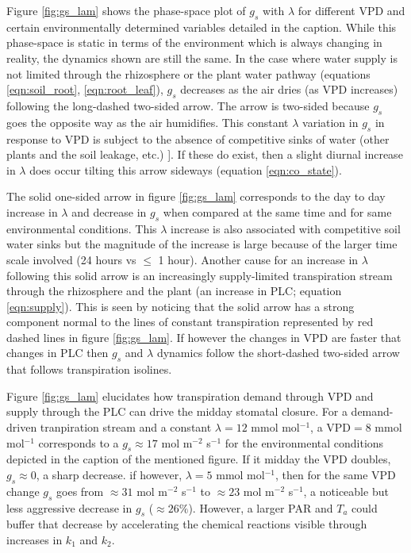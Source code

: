 \documentclass[utf8]{frontiersSCNS} %
\begin{document}
Figure \ref{fig:gs_lam} shows the phase-space plot of $g_s$ with $\lambda$ for different VPD and certain environmentally determined variables detailed in the caption. While this phase-space is static in terms of the environment which is always changing in reality, the dynamics shown are still the same. In the case where water supply is not limited through the rhizosphere or the plant water pathway (equations \ref{eqn:soil_root}, \ref{eqn:root_leaf}), $g_s$ decreases as the air dries (as VPD increases) following the long-dashed two-sided arrow. The arrow is two-sided because $g_s$ goes the opposite way as the air humidifies. This constant $\lambda$ variation in $g_s$ in response to VPD is subject to the absence of competitive sinks of water (other plants and the soil leakage, etc.) ]. If these do exist, then a slight diurnal increase in $\lambda$ does occur tilting this arrow sideways (equation \ref{eqn:co_state}).

The solid one-sided arrow in figure \ref{fig:gs_lam} corresponds to the day to day increase in $\lambda$ and decrease in $g_s$ when compared at the same time and for same environmental conditions. This $\lambda$ increase is also associated with competitive soil water sinks but the magnitude of the increase is large because of the larger time scale involved (24 hours vs $\leq$ 1 hour). Another cause for an increase in $\lambda$ following this solid arrow is an increasingly supply-limited transpiration stream through the rhizosphere and the plant (an increase in PLC; equation \ref{eqn:supply}). This is seen by noticing that the solid arrow has a strong component normal to the lines of constant transpiration represented by red dashed lines in figure \ref{fig:gs_lam}. If however the changes in VPD are faster that changes in PLC then $g_s$ and $\lambda$ dynamics follow the short-dashed two-sided arrow that follows transpiration isolines. 

Figure \ref{fig:gs_lam} elucidates how transpiration demand through VPD and supply through the PLC can drive the midday stomatal closure. For a demand-driven tranpiration stream and a constant $\lambda=12$ mmol mol$^{-1}$, a VPD$=8$ mmol mol$^{-1}$ corresponds to a $g_s\approx 17$ mol m$^{-2}$ s$^{-1}$ for the environmental conditions depicted in the caption of the mentioned figure. If it midday the VPD doubles, $g_s\approx 0$, a sharp decrease. if however, $\lambda=5$ mmol mol$^{-1}$, then for the same VPD change $g_s$ goes from $\approx 31$ mol m$^{-2}$ s$^{-1}$ to $\approx 23$ mol m$^{-2}$ s$^{-1}$, a noticeable but less aggressive decrease in $g_s$ ($\approx 26\%$). However, a larger PAR and $T_a$ could buffer that decrease by accelerating the chemical reactions visible through increases in $k_1$ and $k_2$.
\end{document}
